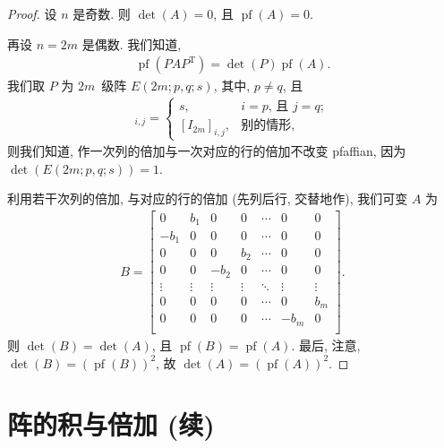 \documentclass[../libro.tex]{subfiles}
\begin{document}
\begin{proof}
    设 \(n\) 是奇数.
    则 \(\det {(A)} = 0\),
    且 \(\operatorname{pf} {(A)} = 0\).

    再设 \(n = 2m\) 是偶数.
    我们知道,
    \begin{align*}
        \operatorname{pf} {(P A P^{\mathrm{T}})}
        = \det {(P)} \operatorname{pf} {(A)}.
    \end{align*}
    我们取 \(P\) 为 \(2m\)~级阵 \(E(2m; p, q; s)\),
    其中, \(p \neq q\), 且
    \begin{align*}
        [E(2m; p, q; s)]_{i,j} =
        \begin{cases}
            s,              & \text{\(i = p\), 且 \(j = q\)}; \\
            [I_{2m}]_{i,j}, & \text{别的情形},
        \end{cases}
    \end{align*}
    则我们知道,
    作一次列的倍加与一次对应的行的倍加不改变 pfaffian,
    因为 \(\det {(E(2m; p, q; s))} = 1\).

    利用若干次列的倍加, 与对应的行的倍加
    (先列后行, 交替地作),
    我们可变 \(A\) 为
    \begin{align*}
        B =
        \begin{bmatrix}
            0      & b_1    & 0      & 0      & \cdots & 0      & 0      \\
            -b_1   & 0      & 0      & 0      & \cdots & 0      & 0      \\
            0      & 0      & 0      & b_2    & \cdots & 0      & 0      \\
            0      & 0      & -b_2   & 0      & \cdots & 0      & 0      \\
            \vdots & \vdots & \vdots & \vdots & \ddots & \vdots & \vdots \\
            0      & 0      & 0      & 0      & \cdots & 0      & b_m    \\
            0      & 0      & 0      & 0      & \cdots & -b_m   & 0      \\
        \end{bmatrix}.
    \end{align*}
    则 \(\det {(B)} = \det {(A)}\),
    且 \(\operatorname{pf} {(B)} = \operatorname{pf} {(A)}\).
    最后, 注意, \(\det {(B)}
    = (\operatorname{pf} {(B)})^2\),
    故 \(\det {(A)}
    = (\operatorname{pf} {(A)})^2\).
\end{proof}

\section{阵的积与倍加 (续)}
\end{document}
